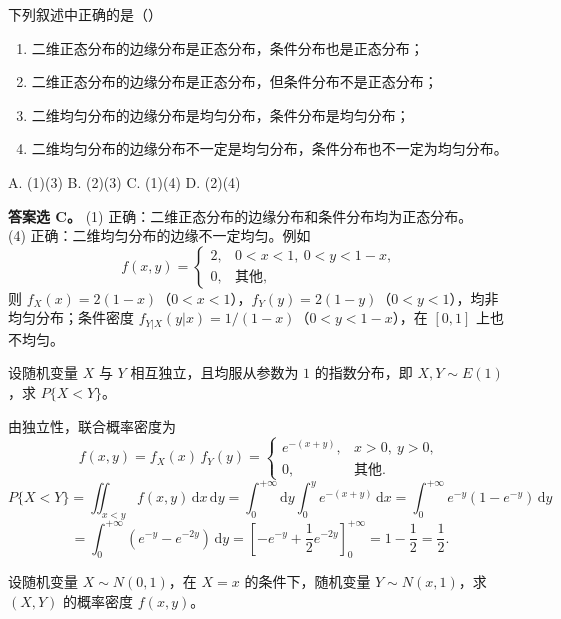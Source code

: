 ﻿\documentclass[lang=cn,11pt]{elegantbook}
\begin{document}
\begin{exercise}[二维分布的性质判断] \label{exer:3-c5b}
下列叙述中正确的是（\quad）
\begin{enumerate}
    \item[(1)] 二维正态分布的边缘分布是正态分布，条件分布也是正态分布；
    \item[(2)] 二维正态分布的边缘分布是正态分布，但条件分布不是正态分布；
    \item[(3)] 二维均匀分布的边缘分布是均匀分布，条件分布是均匀分布；
    \item[(4)] 二维均匀分布的边缘分布不一定是均匀分布，条件分布也不一定为均匀分布。
\end{enumerate}
A. (1)(3) \quad B. (2)(3) \quad C. (1)(4) \quad D. (2)(4)
\end{exercise}
\begin{solution}
\textbf{答案选 C。}
(1) 正确：二维正态分布的边缘分布和条件分布均为正态分布。\\
(4) 正确：二维均匀分布的边缘不一定均匀。例如
\[
f(x,y) = \begin{cases} 2, & 0 < x < 1,\ 0 < y < 1-x, \\ 0, & \text{其他}, \end{cases}
\]
则 $f_X(x) = 2(1-x)$（$0<x<1$），$f_Y(y) = 2(1-y)$（$0<y<1$），均非均匀分布；条件密度 $f_{Y|X}(y|x) = 1/(1-x)$（$0<y<1-x$），在 $[0,1]$ 上也不均匀。
\end{solution}

\begin{exercise}\label{exer:3-5}
设随机变量 $X$ 与 $Y$ 相互独立，且均服从参数为 $1$ 的指数分布，即 $X, Y \sim E(1)$，求 $P\{X < Y\}$。
\end{exercise}

\begin{solution}
由独立性，联合概率密度为
\[
f(x,y) = f_X(x)\,f_Y(y) = \begin{cases} e^{-(x+y)}, & x > 0,\ y > 0, \\ 0, & \text{其他}. \end{cases}
\]
\[
P\{X < Y\} = \iint_{x < y}f(x,y)\,\mathrm{d}x\,\mathrm{d}y = \int_0^{+\infty}\mathrm{d}y\int_0^y e^{-(x+y)}\,\mathrm{d}x = \int_0^{+\infty}e^{-y}(1-e^{-y})\,\mathrm{d}y
\]
\[
= \int_0^{+\infty}(e^{-y} - e^{-2y})\,\mathrm{d}y = \left[-e^{-y} + \frac{1}{2}e^{-2y}\right]_0^{+\infty} = 1 - \frac{1}{2} = \frac{1}{2}.
\]
\end{solution}

\begin{exercise}[条件正态联合密度] \label{exer:3-5b}
设随机变量 $X \sim N(0,1)$，在 $X = x$ 的条件下，随机变量 $Y \sim N(x, 1)$，求 $(X,Y)$ 的概率密度 $f(x,y)$。
\end{exercise}
\end{document}
